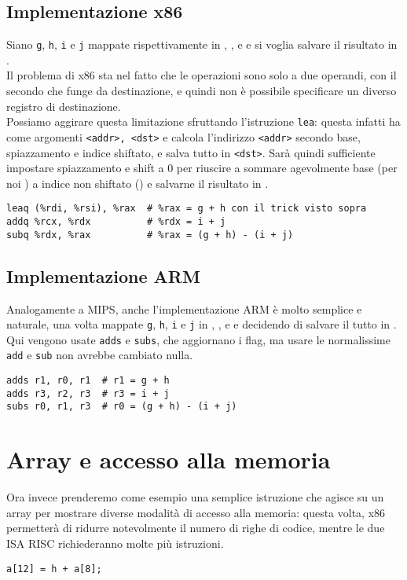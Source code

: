 \documentclass[class=book, crop=false, oneside]{standalone}
\begin{document}
\subsection*{Implementazione x86}
Siano \texttt{g}, \texttt{h}, \texttt{i} e \texttt{j} mappate rispettivamente in , ,  e  e si voglia salvare il risultato in .\\
Il problema di x86 sta nel fatto che le operazioni sono solo a due operandi, con il secondo che funge da destinazione, e quindi non è possibile specificare un diverso registro di destinazione.\\
Possiamo aggirare questa limitazione sfruttando l'istruzione \texttt{lea}: questa infatti ha come argomenti \texttt{<addr>, <dst>} e calcola l'indirizzo \texttt{<addr>} secondo base, spiazzamento e indice shiftato, e salva tutto in \texttt{<dst>}. Sarà quindi sufficiente impostare spiazzamento e shift a 0 per riuscire a sommare agevolmente base (per noi ) a indice non shiftato () e salvarne il risultato in .
\begin{verbatim}
leaq (%rdi, %rsi), %rax  # %rax = g + h con il trick visto sopra
addq %rcx, %rdx          # %rdx = i + j
subq %rdx, %rax          # %rax = (g + h) - (i + j)
\end{verbatim}

\subsection*{Implementazione ARM}
Analogamente a MIPS, anche l'implementazione ARM è molto semplice e naturale, una volta mappate \texttt{g}, \texttt{h}, \texttt{i} e \texttt{j} in , ,  e  e decidendo di salvare il tutto in .\\
Qui vengono usate \texttt{adds} e \texttt{subs}, che aggiornano i flag, ma usare le normalissime \texttt{add} e \texttt{sub} non avrebbe cambiato nulla.
\begin{verbatim}
adds r1, r0, r1  # r1 = g + h
adds r3, r2, r3  # r3 = i + j
subs r0, r1, r3  # r0 = (g + h) - (i + j)
\end{verbatim}

\section{Array e accesso alla memoria}
Ora invece prenderemo come esempio una semplice istruzione che agisce su un array per mostrare diverse modalità di accesso alla memoria: questa volta, x86 permetterà di ridurre notevolmente il numero di righe di codice, mentre le due ISA RISC richiederanno molte più istruzioni.
\begin{verbatim}
a[12] = h + a[8];
\end{verbatim}
\end{document}
